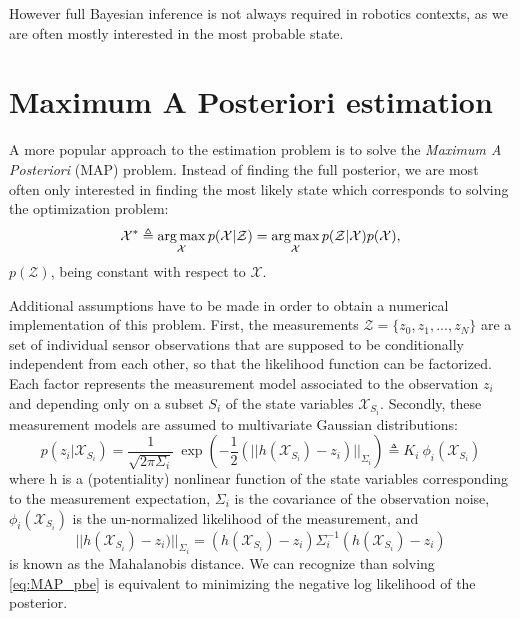 However full Bayesian inference is not always required in robotics contexts, as we are often mostly interested in the most probable state.

\section{Maximum A Posteriori estimation}

A more popular approach to the estimation problem is to solve the \textit{Maximum A Posteriori} (MAP) problem. Instead of finding the full posterior, we are most often only 
interested in finding the most likely state which corresponds to solving the optimization problem:
%
\begin{equation}
    \label{eq:MAP_pbe}
    \mathcal{X}^* \triangleq \operatorname*{arg\,max}_{\mathcal{X}} p(\mathcal{X} | \mathcal{Z}) = \operatorname*{arg\,max}_{\mathcal{X}} p(\mathcal{Z} | \mathcal{X}) p(\mathcal{X}),
\end{equation}
%
$p(\mathcal{Z})$, being constant with respect to $\mathcal{X}$.

Additional assumptions have to be made in order to obtain a numerical implementation of this problem.
First, the measurements $\mathcal{Z} = \{z_0, z_1, ..., z_N\} $ are a set of individual sensor observations that are supposed to be conditionally 
independent from each other, so that the likelihood function can be factorized. Each factor represents the measurement model associated to the 
observation $z_i$ and depending only on a subset $S_i$ of the state variables $\mathcal{X}_{S_i}$. 
Secondly, these measurement models are assumed to multivariate Gaussian distributions:
%
\begin{equation}
    p(z_i | \mathcal{X}_{S_i}) = \frac{1}{\sqrt{2\pi\Sigma_i}} ~ \exp(- \frac{1}{2} (||h(\mathcal{X}_{S_i}) - z_i)||_{\Sigma_i}) \triangleq K_i~\phi_i(\mathcal{X}_{S_i})
\end{equation}
%
where h is a (potentiality) nonlinear function of the state variables corresponding to the measurement expectation, $\Sigma_i$ is the covariance of the observation noise,
$\phi_i(\mathcal{X}_{S_i})$ is the un-normalized likelihood of the measurement,
and 
\begin{equation*}
    ||h(\mathcal{X}_{S_i}) - z_i)||_{\Sigma_i} = (h(\mathcal{X}_{S_i}) - z_i) \Sigma_i^{-1} (h(\mathcal{X}_{S_i}) - z_i)    
\end{equation*}
is known as the Mahalanobis distance. 
We can recognize than solving \ref{eq:MAP_pbe} is equivalent to minimizing the negative log likelihood of the posterior.

